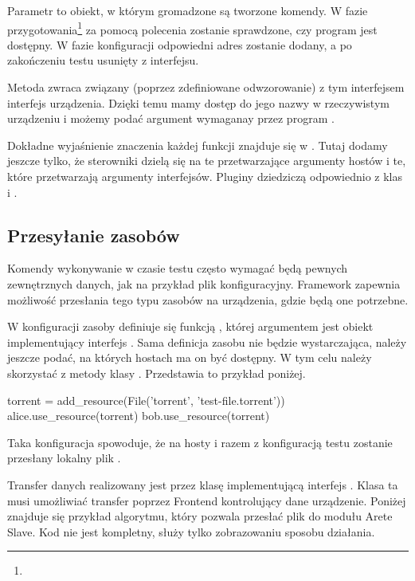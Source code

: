 \documentclass[00-praca-magisterska.tex]{subfiles}
\begin{document}
Parametr  to obiekt, w którym gromadzone są tworzone komendy. W fazie
przygotowania\footnote{} za pomocą polecenia 
zostanie sprawdzone, czy program  jest dostępny. W fazie konfiguracji
odpowiedni adres zostanie dodany, a po zakończeniu testu usunięty z interfejsu.

Metoda  zwraca związany (poprzez zdefiniowane
odwzorowanie) z tym interfejsem interfejs urządzenia. Dzięki temu mamy dostęp do
jego nazwy w rzeczywistym urządzeniu i możemy podać argument wymaganay przez
program .

Dokładne wyjaśnienie znaczenia każdej funkcji znajduje się w . Tutaj dodamy jeszcze tylko, że sterowniki dzielą się na te
przetwarzające argumenty hostów i te, które przetwarzają argumenty interfejsów.
Pluginy dziedziczą odpowiednio z klas  i
.

\subsection{Przesyłanie zasobów}

Komendy wykonywanie w czasie testu często wymagać będą pewnych zewnętrznych
danych, jak na przykład plik konfiguracyjny. Framework zapewnia możliwość
przesłania tego typu zasobów na urządzenia, gdzie będą one potrzebne.

W konfiguracji zasoby definiuje się funkcją , której
argumentem jest obiekt implementujący interfejs . Sama definicja
zasobu nie będzie wystarczająca, należy jeszcze podać, na których hostach ma on
być dostępny. W tym celu należy skorzystać z metody  klasy
. Przedstawia to przykład poniżej.

\begin{pythoncode}
  torrent = add_resource(File('torrent', 'test-file.torrent'))
  alice.use_resource(torrent)
  bob.use_resource(torrent)
\end{pythoncode}

Taka konfiguracja spowoduje, że na hosty  i  razem z
konfiguracją testu zostanie przesłany lokalny plik .

Transfer danych realizowany jest przez klasę implementującą interfejs
. Klasa ta musi umożliwiać transfer poprzez Frontend kontrolujący
dane urządzenie. Poniżej znajduje się przykład algorytmu, który pozwala przesłać
plik do modułu Arete Slave. Kod nie jest kompletny, służy tylko zobrazowaniu
sposobu działania.
\end{document}
